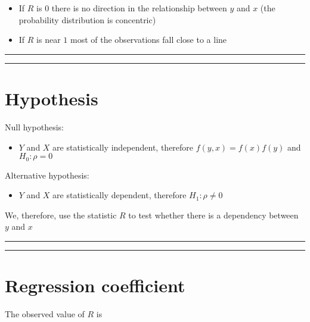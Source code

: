 \documentclass[
]{book}
\providecommand{\tightlist}{%
  \setlength{\itemsep}{0pt}\setlength{\parskip}{0pt}}
\begin{document}
\begin{itemize}
\item
  If \(R\) is \(0\) there is no direction in the relationship between \(y\) and \(x\) (the probability distribution is concentric)
\item
  If \(R\) is near \(1\) most of the observations fall close to a line
\end{itemize}

\begin{center}\rule{0.5\linewidth}{0.5pt}\end{center}

\begin{center}\rule{0.5\linewidth}{0.5pt}\end{center}

\hypertarget{hypothesis-5}{%
\section{Hypothesis}\label{hypothesis-5}}

Null hypothesis:

\begin{itemize}
\tightlist
\item
  \(Y\) and \(X\) are statistically independent, therefore \(f(y,x)=f(x)f(y)\) and \(H_0: \rho=0\)
\end{itemize}

Alternative hypothesis:

\begin{itemize}
\tightlist
\item
  \(Y\) and \(X\) are statistically dependent, therefore \(H_1: \rho \neq 0\)
\end{itemize}

We, therefore, use the statistic \(R\) to test whether there is a dependency between \(y\) and \(x\)

\begin{center}\rule{0.5\linewidth}{0.5pt}\end{center}

\begin{center}\rule{0.5\linewidth}{0.5pt}\end{center}

\hypertarget{regression-coefficient}{%
\section{Regression coefficient}\label{regression-coefficient}}

The observed value of \(R\) is
\end{document}
